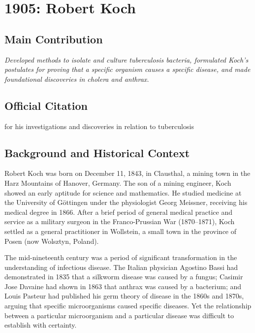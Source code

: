 \chapter[1905 --- Koch]{1905: Robert Koch}
\label{ch:1905_robertkoch}

\section*{Main Contribution}

\textit{Developed methods to isolate and culture tuberculosis bacteria, formulated Koch's postulates for proving that a specific organism causes a specific disease, and made foundational discoveries in cholera and anthrax.}\cite{nobel-1905,lecture-1905}

\section{Official Citation}

for his investigations and discoveries in relation to tuberculosis

\section{Background and Historical Context}

Robert Koch was born on December 11, 1843, in Clausthal, a mining town in the Harz Mountains of Hanover, Germany. The son of a mining engineer, Koch showed an early aptitude for science and mathematics. He studied medicine at the University of G\"ottingen under the physiologist Georg Meissner, receiving his medical degree in 1866. After a brief period of general medical practice and service as a military surgeon in the Franco-Prussian War (1870--1871), Koch settled as a general practitioner in Wollstein, a small town in the province of Posen (now Wolsztyn, Poland).

The mid-nineteenth century was a period of significant transformation in the understanding of infectious disease. The Italian physician Agostino Bassi had demonstrated in 1835 that a silkworm disease was caused by a fungus; Casimir Jose Davaine had shown in 1863 that anthrax was caused by a bacterium; and Louis Pasteur had published his germ theory of disease in the 1860s and 1870s, arguing that specific microorganisms caused specific diseases. Yet the relationship between a particular microorganism and a particular disease was difficult to establish with certainty.

